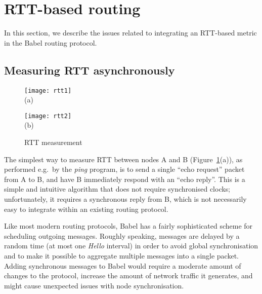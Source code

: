 \documentclass[conference,letterpaper]{IEEEtran}
\begin{document}
\section{RTT-based routing}

In this section, we describe the issues related to integrating an
RTT-based metric in the Babel routing protocol.

\subsection{Measuring RTT asynchronously} \label{sec:async-rtt}

\begin{figure}[htb]
\begin{minipage}[b]{0.2\textwidth}
\centering
\texttt{[image: rtt1]}\\
(a)
\end{minipage}
\hfill
\begin{minipage}[b]{0.2\textwidth}
\centering
\texttt{[image: rtt2]}\\
(b)
\end{minipage}
\caption{RTT measurement}\label{fig:rtt}
\end{figure}

The simplest way to measure RTT between nodes A and
B (Figure~\ref{fig:rtt}(a)), as performed e.g.\ by the \emph{ping}
program, is to send a single ``echo request'' packet from A to B, and
have B immediately respond with an ``echo reply''.  This is a simple
and intuitive algorithm that does not require synchronised clocks;
unfortunately, it requires a synchronous reply from B, which is not
necessarily easy to integrate within an existing routing protocol.

Like most modern routing protocols, Babel has a fairly sophisticated
scheme for scheduling outgoing messages.  Roughly speaking, messages
are delayed by a random time (at most one \emph{Hello} interval) in
order to avoid global synchronisation \cite{jitter} and to make it
possible to aggregate multiple messages into a single packet.  Adding
synchronous messages to Babel would require a moderate amount of
changes to the protocol, increase the amount of network traffic it
generates, and might cause unexpected issues with node
synchronisation.
\end{document}
